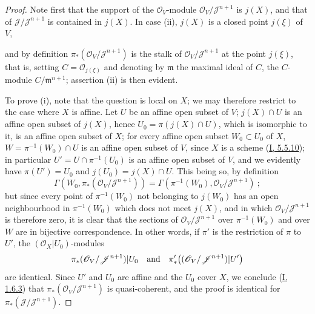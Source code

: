 \begin{proof}
Note first that the support of the $\mathcal{O}_V$-module
$\mathcal{O}_V/\mathcal{J}^{n+1}$ is $j(X)$, and that of
$\mathcal{J}/\mathcal{J}^{n+1}$ is contained in $j(X)$. In case (ii),
$j(X)$ is a closed point $j(\xi)$ of $V$,

and by definition $\pi_*(\mathcal{O}_V/\mathcal{J}^{n+1})$ is the stalk of
$\mathcal{O}_V/\mathcal{J}^{n+1}$ at the point $j(\xi)$, that is, setting
$C=\mathcal{O}_{j(\xi)}$ and denoting by $\mathfrak{m}$ the maximal ideal
of $C$, the $C$-module $C/\mathfrak{m}^{n+1}$; assertion (ii) is then
evident.

To prove (i), note that the question is local on $X$; we may therefore
restrict to the case where $X$ is affine. Let $U$ be an affine open subset of
$V$; $j(X)\cap U$ is an affine open subset of $j(X)$, hence
$U_0=\pi(j(X)\cap U)$, which is isomorphic to it, is an affine open subset of
$X$; for every affine open subset $W_0\subset U_0$ of $X$,
$W=\pi^{-1}(W_0)\cap U$ is an affine open subset of $V$, since $X$ is a
scheme (\hyperref[I.5.5.10]{I, 5.5.10}); in particular
$U'=U\cap\pi^{-1}(U_0)$ is an affine open subset of $V$, and we evidently have
$\pi(U')=U_0$ and $j(U_0)=j(X)\cap U$. This being so, by definition
\[
  \Gamma(W_0,\pi_*(\mathcal{O}_V/\mathcal{J}^{n+1}))
  =\Gamma(\pi^{-1}(W_0),\mathcal{O}_V/\mathcal{J}^{n+1})~;
\]
but since every point of $\pi^{-1}(W_0)$ not belonging to $j(W_0)$ has an
open neighbourhood in $\pi^{-1}(W_0)$ which does not meet $j(X)$, and in
which $\mathcal{O}_V/\mathcal{J}^{n+1}$ is therefore zero, it is clear that
the sections of $\mathcal{O}_V/\mathcal{J}^{n+1}$ over $\pi^{-1}(W_0)$ and
over $W$ are in bijective correspondence. In other words, if $\pi'$ is
the restriction of $\pi$ to $U'$, the $(\mathcal{O}_X|U_0)$-modules
\[
  \pi_*(\mathcal{O}_V/\mathcal{J}^{n+1})|U_0
  \quad\hbox{and}\quad
  \pi'_*\bigl((\mathcal{O}_V/\mathcal{J}^{n+1})|U'\bigr)
\]
are identical. Since $U'$ and $U_0$ are affine and the $U_0$ cover
$X$, we conclude (\hyperref[I.1.6.3]{I, 1.6.3}) that
$\pi_*(\mathcal{O}_V/\mathcal{J}^{n+1})$ is quasi-coherent, and the
proof is identical for
$\pi_*(\mathcal{J}/\mathcal{J}^{n+1})$.


\end{proof}
